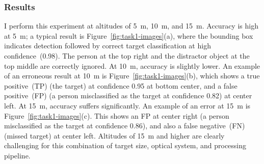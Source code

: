 \endgroup


\subsubsection{Results}
\label{sec:task1-results}

I perform this experiment at altitudes of 5~m, 10~m, and 15~m.
Accuracy is high at 5~m; a typical result is
Figure~\ref{fig:task1-images}(a), where the bounding box indicates
detection followed by correct target classification at high
confidence~(0.98).  The person at the top right and the distractor
object at the top middle are correctly ignored.  At 10~m, accuracy is
slightly lower.  An example of an erroneous result at 10~m is
Figure~\ref{fig:task1-images}(b), which shows a true positive~(TP)
(the target) at confidence 0.95 at bottom center, and a false
positive~(FP) (a person misclassified as the target at confidence
0.82) at center left.  At 15~m, accuracy suffers significantly.  An
example of an error at 15~m is Figure~\ref{fig:task1-images}(c).  This
shows an FP at center right (a person misclassified as the
target at confidence 0.86), and also a false negative~(FN) (missed target)
at center left.  Altitudes of 15~m and higher are clearly challenging
for this combination of target size, optical system, and processing pipeline.


